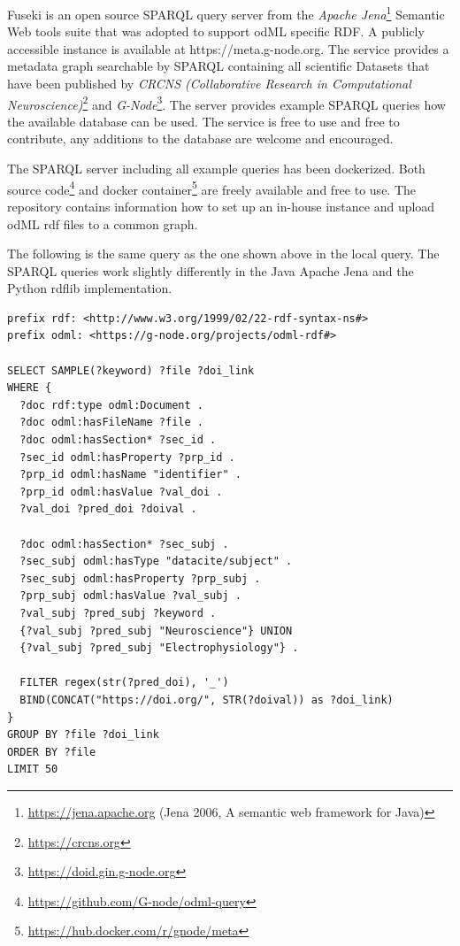 \documentclass{article}
\begin{document}
Fuseki is an open source SPARQL query server from the \textit{Apache Jena}\footnote{\url{https://jena.apache.org} (Jena 2006, A semantic web framework for Java)} Semantic Web tools suite that was adopted to support odML specific RDF. A publicly accessible instance is available at https://meta.g-node.org. The service provides a metadata graph searchable by SPARQL containing all scientific Datasets that have been published by \textit{CRCNS (Collaborative Research in Computational Neuroscience)}\footnote{\url{https://crcns.org}} and \textit{G-Node}\footnote{\url{https://doid.gin.g-node.org}}. The server provides example SPARQL queries how the available database can be used. The service is free to use and free to contribute, any additions to the database are welcome and encouraged.

The SPARQL server including all example queries has been dockerized. Both source code\footnote{\url{https://github.com/G-node/odml-query}} and docker container\footnote{\url{https://hub.docker.com/r/gnode/meta}} are freely available and free to use. The repository contains information how to set up an in-house instance and upload odML rdf files to a common graph.

The following is the same query as the one shown above in the local query. The SPARQL queries work slightly differently in the Java Apache Jena and the Python rdflib implementation.

\begin{lstlisting}[label=lst:query_server, caption=Example query server, basicstyle=\small]
prefix rdf: <http://www.w3.org/1999/02/22-rdf-syntax-ns#>
prefix odml: <https://g-node.org/projects/odml-rdf#>

SELECT SAMPLE(?keyword) ?file ?doi_link
WHERE {
  ?doc rdf:type odml:Document .
  ?doc odml:hasFileName ?file .
  ?doc odml:hasSection* ?sec_id .
  ?sec_id odml:hasProperty ?prp_id .
  ?prp_id odml:hasName "identifier" .
  ?prp_id odml:hasValue ?val_doi .
  ?val_doi ?pred_doi ?doival .

  ?doc odml:hasSection* ?sec_subj .
  ?sec_subj odml:hasType "datacite/subject" .
  ?sec_subj odml:hasProperty ?prp_subj .
  ?prp_subj odml:hasValue ?val_subj .
  ?val_subj ?pred_subj ?keyword .
  {?val_subj ?pred_subj "Neuroscience"} UNION
  {?val_subj ?pred_subj "Electrophysiology"} .

  FILTER regex(str(?pred_doi), '_')
  BIND(CONCAT("https://doi.org/", STR(?doival)) as ?doi_link)
}
GROUP BY ?file ?doi_link
ORDER BY ?file
LIMIT 50
\end{lstlisting}
\end{document}
